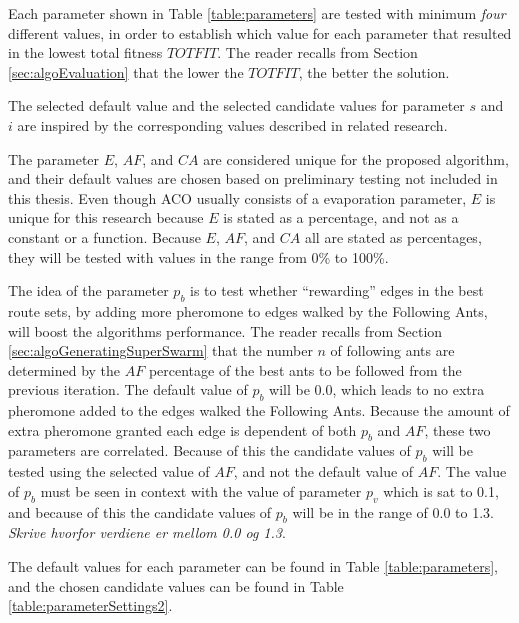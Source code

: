 Each parameter shown in Table \ref{table:parameters} are tested with minimum \textit{four} different values, in order to establish which value for each parameter that resulted in the lowest total fitness $TOTFIT$. The reader recalls from Section \vref{sec:algoEvaluation} that the lower the $TOTFIT$, the better the solution. 

The selected default value and the selected candidate values for parameter $s$ and $i$ are inspired by the corresponding values described in related research\citep{salehi-nezhad07, poorzahedy11, sedighpour14, kechagiopoulos14}.

The parameter $E$, $AF$, and $CA$ are considered unique for the proposed algorithm, and their default values are chosen based on preliminary testing not included in this thesis. Even though ACO usually consists of a evaporation parameter, $E$ is unique for this research because $E$ is stated as a percentage, and not as a constant or a function. 
Because $E$, $AF$, and $CA$ all are stated as percentages, they will be tested with values in the range from 0\% to 100\%. %

The idea of the parameter $p_b$ is to test whether ``rewarding'' edges in the best route sets, by adding more pheromone to edges walked by the Following Ants, will boost the algorithms performance. The reader recalls from Section \vref{sec:algoGeneratingSuperSwarm} that the number $n$ of following ants are determined by the $AF$ percentage of the best ants to be followed from the previous iteration. The default value of $p_b$ will be 0.0, which leads to no extra pheromone added to the edges walked the Following Ants. Because the amount of extra pheromone granted each edge is dependent of both $p_b$ and $AF$, these two parameters are correlated. Because of this the candidate values of $p_b$ will be tested using the selected value of $AF$, and not the default value of $AF$. The value of $p_b$ must be seen in context with the value of parameter $p_v$ which is sat to 0.1, and because of this the candidate values of $p_b$ will be in the range of 0.0 to 1.3.\emph{\color{blue} Skrive hvorfor verdiene er mellom 0.0 og 1.3}.  

The default values for each parameter can be found in Table \ref{table:parameters}, and the chosen candidate values can be found in Table \vref{table:parameterSettings2}.

